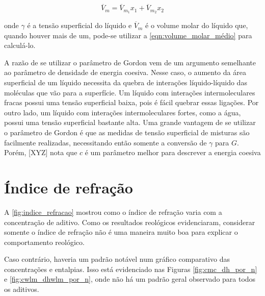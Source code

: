 		\begin{equation}
			\overline{V}_m = \overline{V}_{m_{1}}x_1 + \overline{V}_{m_{2}}x_2
			\label{eqn:volume_molar_médio}
		\end{equation}
		
		\noindent onde \(\gamma\) é a tensão superficial do líquido e \(\overline{V}_m\) é o volume molar do líquido que, quando houver mais de um, pode-se utilizar a \autoref{eqn:volume_molar_médio} para calculá-lo.
		
				
		A razão de se utilizar o parâmetro de Gordon vem de um argumento semelhante ao parâmetro de densidade de energia coesiva. Nesse caso, o aumento da área superficial de um líquido necessita da quebra de interações líquido-líquido das moléculas que vão para a superfície. Um líquido com interações intermoleculares fracas possui uma tensão superficial baixa, pois é fácil quebrar essas ligações. Por outro lado, um líquido com interações intermoleculares fortes, como a água, possui uma tensão superficial bastante alta. Uma grande vantagem de se utilizar o parâmetro de Gordon é que as medidas de tensão superficial de misturas são facilmente realizadas, necessitando então somente a conversão de \(\gamma\) para \(G\). Porém, [XYZ] nota que \(c\) é um parâmetro melhor para descrever a energia coesiva %
	

		\section{Índice de refração}
		
		A \autoref{fig:indice_refracao} mostrou como o índice de refração varia com a concentração de aditivo. Como os resultados reológicos evidenciaram, considerar somente o índice de refração não é uma maneira muito boa para explicar o comportamento reológico.
		
		Caso contrário, haveria um padrão notável num gráfico comparativo das concentrações e entalpias. Isso está evidenciado nas Figuras \ref{fig:cmc_dh_por_n} e \ref{fig:cwlm_dhwlm_por_n}, onde não há um padrão geral observado para todos os aditivos.
		
